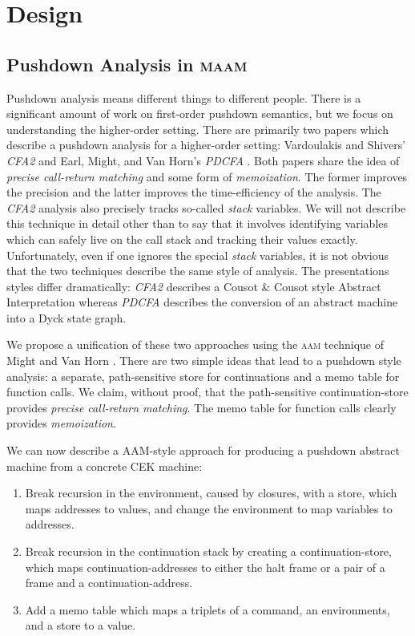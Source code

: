\documentclass[10pt,letter,english]{article}
\newcommand{\aam}[0]{\textsc{aam}}
\newcommand{\maam}[0]{\textsc{maam}}
\begin{document}
\section{Design}
\subsection{Pushdown Analysis in \maam{}}

Pushdown analysis means different things to different people. There is a
significant amount of work on first-order pushdown semantics, but we focus on
understanding the higher-order setting. There are primarily two papers which
describe a pushdown analysis for a higher-order setting: Vardoulakis and
Shivers' \emph{CFA2} \cite{cfa2} and Earl, Might, and Van Horn's \emph{PDCFA}
\cite{pdcfa}. Both papers share the idea of \emph{precise call-return matching}
and some form of \emph{memoization}. The former improves the precision and the
latter improves the time-efficiency of the analysis. The \emph{CFA2} analysis
also precisely tracks so-called \emph{stack} variables. We will not describe
this technique in detail other than to say that it involves identifying
variables which can safely live on the call stack and tracking their values
exactly. Unfortunately, even if one ignores the special \emph{stack} variables,
it is not obvious that the two techniques describe the same style of
analysis. The presentations styles differ dramatically: \emph{CFA2} describes a
Cousot \& Cousot style Abstract Interpretation whereas \emph{PDCFA} describes
the conversion of an abstract machine into a Dyck state graph.

We propose a unification of these two approaches using the \aam{} technique of
Might and Van Horn \cite{aam}. There are two simple ideas that lead to a
pushdown style analysis: a separate, path-sensitive store for continuations and
a memo table for function calls. We claim, without proof, that the
path-sensitive continuation-store provides \emph{precise call-return matching}.
The memo table for function calls clearly provides \emph{memoization}.

We can now describe a AAM-style approach for producing a pushdown abstract
machine from a concrete CEK machine:
\begin{enumerate}
\item Break recursion in the environment, caused by closures, with a store,
  which maps addresses to values, and change the environment to map variables to
  addresses.
\item Break recursion in the continuation stack by creating a
  continuation-store, which maps continuation-addresses to either the halt frame
  or a pair of a frame and a continuation-address.
\item Add a memo table which maps a triplets of a command, an environments, and
  a store to a value.
\end{enumerate}
\end{document}
